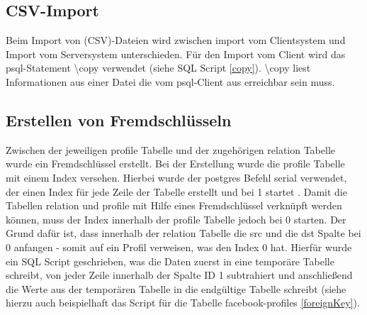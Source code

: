 \subsection{CSV-Import}
Beim Import von (CSV)-Dateien wird zwischen import vom Clientsystem und  Import vom Serversystem unterschieden. 
Für den Import vom Client wird das psql-Statement \textbackslash copy verwendet (siehe SQL Script \ref{copy}). \textbackslash copy liest Informationen aus einer Datei
die vom psql-Client aus erreichbar sein muss. \cite{postgres2018}

\subsection{Erstellen von Fremdschlüsseln}
Zwischen der jeweiligen profile Tabelle und der zugehörigen relation Tabelle wurde ein Fremdschlüssel erstellt. Bei der Erstellung wurde die profile Tabelle
mit einem Index versehen. Hierbei wurde der postgres Befehl serial verwendet, der einen Index für jede Zeile der Tabelle erstellt und bei 1 startet . Damit die Tabellen
relation und profile mit Hilfe eines Fremdschlüssel verknüpft werden können, muss der Index innerhalb der profile Tabelle jedoch bei 0 starten. Der Grund dafür ist, dass
innerhalb der relation Tabelle die src und die dst Spalte bei 0 anfangen - somit auf ein Profil verweisen, was den Index 0 hat. Hierfür wurde ein SQL Script geschrieben,
was die Daten zuerst in eine temporäre Tabelle schreibt, von jeder Zeile innerhalb der Spalte ID 1 subtrahiert und anschließend die Werte aus der temporären Tabelle
in die endgültige Tabelle schreibt (siehe hierzu auch beispielhaft das Script für die Tabelle facebook-profiles \ref{foreignKey}).

